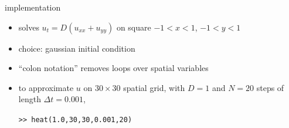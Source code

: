 \begin{frame}{implementation}
\label{slide:heatmatlab}


\small
\begin{itemize}
\item solves $u_t = D(u_{xx} + u_{yy})$ on square $-1 < x < 1$, $-1 < y < 1$
\item choice: gaussian initial condition
\item ``colon notation'' removes loops over spatial variables
\item to approximate $u$ on $30\times 30$ spatial grid, with $D=1$ and $N=20$ steps of length $\Delta t = 0.001$,

\texttt{>>  heat(1.0,30,30,0.001,20)}
\end{itemize}
\end{frame}


